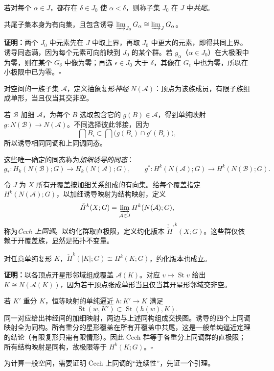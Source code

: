 若对每个 $\alpha\in J$，都存在 $\delta\in J_0$ 使 $\alpha<\delta$，则称子集 $J_0$ 在 $J$ 中\emph{共尾}。

共尾子集本身为有向集，且包含诱导 $\varinjlim_{J_0}G_\alpha\cong\varinjlim_JG_\alpha$。

\textbf{证明：}两个 $J_0$ 中元素先在 $J$ 中取上界，再取 $J_0$ 中更大的元素，即得共同上界。诱导同态满，因为每个元素可向前映到 $J_0$ 的某个群。若 $g_\alpha$（$\alpha\in J_0$）在大极限中为零，则在某个 $G_\delta$ 中像为零；再选 $\epsilon\in J_0$ 大于 $\delta$，其像在 $G_\epsilon$ 中也为零，所以在小极限中已为零。\hfill$\square$

对空间的一族子集 $\mathcal A$，定义抽象复形\emph{神经} $N(\mathcal A)$：顶点为该族成员，有限子族组成单形，当且仅当其交非空。

若 $\mathcal B$ 加细 $\mathcal A$，为每个 $B$ 选取包含它的 $g(B)\in\mathcal A$，得到单纯映射 $g:N(\mathcal B)\to N(\mathcal A)$。不同选择彼此邻接，因为
\[\bigcap B_i\subset\bigcap\bigl(g(B_i)\cap g'(B_i)\bigr),\]
所以诱导相同同调和上同调同态。

这些唯一确定的同态称为\emph{加细诱导的同态}：
\[g_*:H_k(N(\mathcal B);G)\to H_k(N(\mathcal A);G),\qquad
g^*:H^k(N(\mathcal A);G)\to H^k(N(\mathcal B);G).\]

令 $J$ 为 $X$ 所有开覆盖按加细关系组成的有向集。给每个覆盖指定 $H^k(N(\mathcal A);G)$，以加细诱导映射为结构映射，定义
\[\check H^k(X;G)=\varinjlim_{\mathcal A\in J}H^k(N(\mathcal A);G),\]
称为\emph{Čech 上同调}。以约化群取直极限，定义约化版本 $\check{\widetilde H}^{,k}(X;G)$。这些群仅依赖于开覆盖族，显然是拓扑不变量。

对任意单纯复形 $K$，$\check H^k(|K|;G)\cong H^k(K;G)$，约化版本也成立。

\textbf{证明：}以各顶点开星形邻域组成覆盖 $\mathcal A(K)$。对应 $v\mapsto\operatorname{St}v$ 给出 $K\cong N(\mathcal A(K))$，因为若干顶点张成单形当且仅当其开星形邻域交非空。

若 $K'$ 重分 $K$，恒等映射的单纯逼近 $h:K'\to K$ 满足
\[\operatorname{St}(w,K')\subset\operatorname{St}(h(w),K).\]
同一对应给出神经间的加细映射，两边与上述同构组成交换图。诱导的四个上同调映射全为同构。所有重分的星形覆盖在所有开覆盖中共尾，这是一般单纯逼近定理的结论（有限复形只需有限情形）。因此 Čech 群等于各重分上同调群的直极限；所有结构映射是同构，故极限等于 $H^k(K;G)$。\hfill$\square$

为计算一般空间，需要证明 Čech 上同调的“连续性”，先证一个引理。

